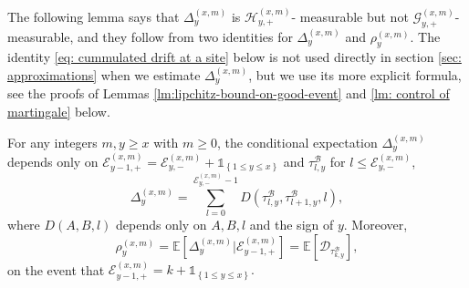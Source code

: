 \documentclass[EJP]{ejpecp} %
\begin{document}
The following lemma says that $\Delta^{(x,m)}_{y}$ is $\mathcal{H}_{y, +}^{(x,m)}$- measurable but not $\mathcal{G}_{y, +}^{(x,m)}$- measurable, and they follow from two identities for $\Delta^{(x,m)}_{y}$ and $\rho_{y}^{(x,m)}$. The identity \eqref{eq: cummulated drift at a site} below is not used directly in section \ref{sec: approximations} when we estimate $\Delta^{(x,m)}_{y}$, but we use its more explicit formula, see the proofs of Lemmas \ref{lm:lipchitz-bound-on-good-event} and \ref{lm: control of martingale} below.
\begin{lemma}\label{lm: identities for Del, rho} 
	For any integers $m,y\geq x$ with $m\geq 0$, the conditional expectation $\Delta^{(x,m)}_{y}$ depends only on $ \mathcal{E}_{y-1,+}^{(x,m)} = \mathcal{E}_{y,-}^{(x,m)} + \mathbb{1}_{ \left\{ 1\leq y \leq x \right\} }$ and $ \tau^{\mathscr{B}}_{l,y}$ for $l\leq \mathcal{E}^{(x,m)}_{y,-} $,
	\begin{equation} \label{eq: cummulated drift at a site}
		\Delta_{y}^{(x,m)} = \sum_{l=0 }^{ \mathcal{E}^{(x,m)}_{y,-} -1  } D\left(\tau^{\mathscr{B}}_{l,y},\tau^{\mathscr{B}}_{l+1,y},l \right),
	\end{equation}	
	where $D(A,B,l)$ depends only on $A,B,l$ and the sign of $y$.
	Moreover, 
	\begin{equation} \label{eq: conditional mean in GPU represenetation}
		\rho_{y}^{(x,m)} = \mathbb{E}\left[ \Delta_{y}^{(x,m)}\vert \mathcal{E}^{(x,m)}_{y-1,+} \right]	  
		= \mathbb{E}\left[  \mathscr{D}_{\tau^{\mathscr{B}}_{k,y}} \right],
	\end{equation} 
	on the event that $\mathcal{E}^{(x,m)}_{y-1,+}  = k + \mathbb{1}_{\left\{1\leq y\leq x\right\}}.$
\end{lemma}
\end{document}
